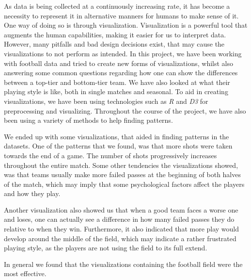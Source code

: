 \documentclass[Report.tex]{subfiles}
\begin{document}
 
As data is being collected at a continuously increasing rate, it has become a necessity to represent it in alternative manners for humans to make sense of it. One way of doing so is through visualization. Visualization is a powerful tool that augments the human capabilities, making it easier for us to interpret data. However, many pitfalls and bad design decisions exist, that may cause the visualizations to not perform as intended. In this project, we have been working with football data and tried to create new forms of visualizations, whilst also answering some common questions regarding how one can show the differences between a top-tier and bottom-tier team. We have also looked at what their playing style is like, both in single matches and seasonal. To aid in creating visualizations, we have been using technologies such as \emph{R} and \emph{D3} for preprocessing and visualizing. Throughout the course of the project, we have also been using a variety of methods to help finding patterns. 

We ended up with some visualizations, that aided in finding patterns in the datasets. One of the patterns that we found, was that more shots were taken towards the end of a game. The number of shots progressively increases throughout the entire match. Some other tendencies the visualizations showed, was that teams usually make more failed passes at the beginning of both halves of the match, which may imply that some psychological factors affect the players and how they play. 

Another visualization also showed us that when a good team faces a worse one and loses, one can actually see a difference in how many failed passes they do relative to when they win. Furthermore, it also indicated that more play would develop around the middle of the field, which may indicate a rather frustrated playing style, as the players are not using the field to its full extend. 

In general we found that the visualizations containing the football field were the most effective. 
\end{document}
